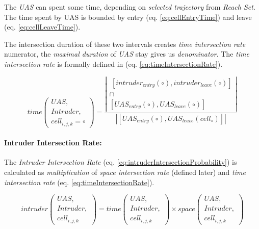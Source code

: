 \noindent The \emph{UAS} can spent some time, depending on \emph{selected trajectory} from \emph{Reach Set}. The time spent by UAS is bounded by entry (eq. \ref{eq:cellEntryTime}) and leave (eq. \ref{eq:cellLeaveTime}). 

The intersection duration of these two intervals creates \emph{time intersection rate} numerator, the \emph{maximal duration} of \emph{UAS} stay gives us \emph{denominator}. The \emph{time intersection rate} is formally defined in (eq. \ref{eq:timeIntersectionRate}). 

\begin{equation}\label{eq:timeIntersectionRate}
    time\left(\begin{gathered}UAS,\\Intruder,\\cell_{i,j,k}=\circ\end{gathered}\right)=  
    \frac{
        \left|
        \begin{gathered}
            \ [intruder_{entry}(\circ),intruder_{leave}(\circ)] \\
            \cap\\
            [UAS_{entry}(\circ),UAS_{leave}(\circ)]
        \end{gathered}\right|
        }
        {
        \left|\left[UAS_{entry}(\circ),UAS_{leave}(cell_{\circ})\right]\right|
        }
\end{equation}


\paragraph{Intruder Intersection Rate:} The \emph{Intruder Intersection Rate} (eq. \ref{eq:intruderIntersectionProbability}) is calculated as \emph{multiplication} of \emph{space intersection rate} (defined later) and \emph{time intersection rate} (eq. \ref{eq:timeIntersectionRate}).

\begin{equation}\label{eq:intruderIntersectionProbability}
    intruder\left(\begin{gathered}UAS,\\Intruder,\\cell_{i,j,k}\end{gathered}\right) = time \left(\begin{gathered}UAS,\\Intruder,\\cell_{i,j,k}\end{gathered}\right) \times space\left(\begin{gathered}UAS,\\Intruder,\\cell_{i,j,k}\end{gathered}\right)
\end{equation}

